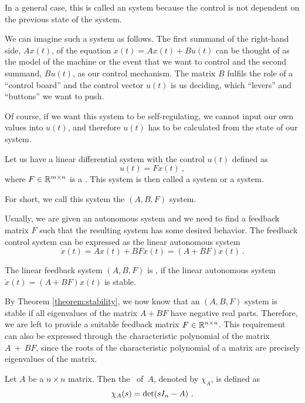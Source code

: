 In a general case, this is called an  system because the control is not dependent on the previous state of the system.

We can imagine such a system as follows. The first summand of the right-hand side, $Ax(t)$, of the equation $\dot{x}(t)=Ax(t)+Bu(t)$ can be thought of as the model of the machine or the event that we want to control and the second summand, $Bu(t)$, as our control mechanism. The matrix $B$ fulfils the role of a ``control board'' and the control vector $u(t)$ is us deciding, which ``levers'' and ``buttons'' we want to push. 

Of course, if we want this system to be self-regulating, we cannot input our own values into $u(t)$, and therefore $u(t)$ has to be calculated from the state of our system.

\begin{definition}
	Let us have a linear differential system with the control $u(t)$ defined as
	$$u(t)=Fx(t)\ ,$$
	where $F\in\mathbb{R}^{m\times n}$ is a . This system is then called a  system or a  system.

	For short, we call this system the $(A,B,F)$ system.
\end{definition}

Usually, we are given an autonomous system and we need to find a feedback matrix $F$ such that the resulting system has some desired behavior. The feedback control system can be expressed as the linear autonomous system
$$\dot{x}(t)=Ax(t)+BFx(t)=(A+BF)x(t)\ .$$

\begin{definition}
	The linear feedback system $(A,B,F)$ is , if the linear autonomous system $\dot{x}(t)=(A+BF)x(t)$ is stable.
\end{definition}

By Theorem \ref{theorem:stability}, we now know that an $(A,B,F)$ system is stable if all eigenvalues of the matrix $A+BF$ have negative real parts. Therefore, we are left to provide a suitable feedback matrix $F \in \mathbb{R}^{n \times n}$. This requirement can also be expressed through the characteristic polynomial of the matrix $A~+~BF$, since the roots of the characteristic polynomial of a matrix are precisely eigenvalues of the matrix.

\begin{definition}
	Let $A$ be a $n\times n$ matrix. Then the ~of~$A$, denoted by $\chi_A$, is defined as $$\chi_A(s)=\textnormal{det}(sI_n-A)\ .$$
\end{definition}

